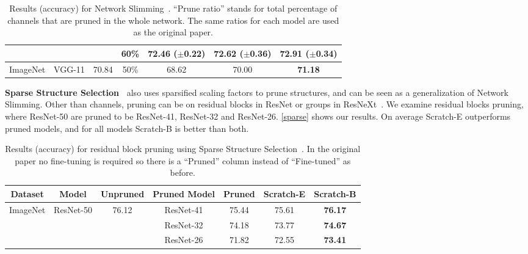 \begin{table}[!htbp]
{\begin{tabular}{c|c|ccccc}
\multicolumn{1}{l|}{} &   &   & \multicolumn{1}{c}{60\%} & \multicolumn{1}{c}{72.46 ($\pm$0.22)} & \multicolumn{1}{c}{72.62 ($\pm$0.36)} &  \textbf{72.91} ($\pm$0.34)        \\ \hline
ImageNet     & VGG-11   & \multicolumn{1}{c}{70.84}   & \multicolumn{1}{c}{50\%}   & \multicolumn{1}{c}{68.62}   & \multicolumn{1}{c}{70.00}  & \textbf{71.18} \\ \hline
\end{tabular}
}
\caption{Results (accuracy) for Network Slimming~\cite{liu2017learning}. ``Prune ratio'' stands for total percentage of channels that are pruned in the whole network. The same ratios for each model are used as the original paper. 
}
\label{network-slimming}
\end{table}

\textbf{Sparse Structure Selection~\cite{huang2018data}} also uses sparsified scaling factors to prune structures, and can be seen as a generalization of Network Slimming. Other than channels, pruning can be on residual blocks in ResNet or groups in ResNeXt~\cite{Xie2017}. We examine residual blocks pruning, where ResNet-50 are pruned to be ResNet-41, ResNet-32 and ResNet-26. \autoref{sparse} shows our results. On average Scratch-E outperforms pruned models, and for all models Scratch-B is better than both.


\renewcommand{\arraystretch}{1.2}
\begin{table}[!htbp]
\small
\centering
\begin{tabular}{l|c|ccccc}
\hline
\multicolumn{1}{c|}{Dataset} & Model                      & Unpruned               & Pruned Model & Pruned                          & Scratch-E  & Scratch-B                      \\ \hline
\multirow{3}{*}{ImageNet}    & \multirow{3}{*}{ResNet-50} & \multirow{3}{*}{76.12} & ResNet-41    & 75.44                           & 75.61     & \textbf{76.17} \\
                             &                            &                        & ResNet-32    & 74.18 & 73.77    & \textbf{74.67}       \\
                             &                            &                        & ResNet-26    & 71.82                           & 72.55 & \textbf{73.41}    \\ \hline
\end{tabular}
\caption{Results (accuracy) for residual block pruning using Sparse Structure Selection~\cite{huang2018data}. In the original paper no fine-tuning is required so there is a ``Pruned'' column instead of ``Fine-tuned'' as before. 
}
\label{sparse}
\end{table}

